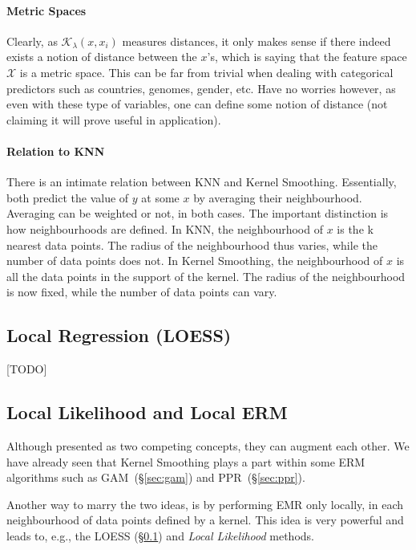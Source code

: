 \documentclass[12pt,a4paper]{article}
\theoremstyle{plain}
\theoremstyle{definition}
\newcommand{\kernel}{\mathcal{K}}
\newcommand{\featureS}{\mathcal{X}}
\begin{document}
\paragraph{Metric Spaces}
Clearly, as $\kernel_\lambda(x,x_i)$ measures distances, it only makes sense if there indeed exists a notion of distance between the $x$'s, which is saying that the feature space $\featureS$ is a metric space. 
This can be far from trivial when dealing with categorical predictors such as countries, genomes, gender, etc.
Have no worries however, as even with these type of variables, one can define some notion of distance (not claiming it will prove useful in application).


\paragraph{Relation to KNN}
There is an intimate relation between KNN and Kernel Smoothing. 
Essentially, both predict the value of $y$ at some $x$ by averaging their neighbourhood. 
Averaging can be weighted or not, in both cases.
The important distinction is how neighbourhoods are defined.
In KNN, the neighbourhood of $x$ is the k nearest data points. The radius of the neighbourhood thus varies, while the number of data points does not.
In Kernel Smoothing, the neighbourhood of $x$ is all the data points in the support of the kernel. The radius of the neighbourhood is now fixed, while the number of data points can vary.




\subsection{Local Regression (LOESS)}
\label{sec:loess}
[TODO]



\subsection{Local Likelihood and Local ERM}
Although presented as two competing concepts, they can augment each other. 
We have already seen that Kernel Smoothing plays a part within some ERM algorithms such as GAM~(\S\ref{sec:gam}) and PPR~(\S \ref{sec:ppr}).

Another way to marry the two ideas, is by performing EMR only locally, in each neighbourhood of data points defined by a kernel. This idea is very powerful and leads to, e.g., the LOESS (\S \ref{sec:loess}) and \emph{Local Likelihood} methods.
\end{document}
